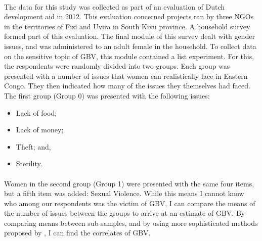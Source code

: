 \documentclass[11pt,a4paper]{scrartcl} %
\begin{document}
\paragraph{}
The data for this study was collected as part of an evaluation of Dutch development aid in 2012. This evaluation concerned projects ran by three NGOs in the territories of Fizi and Uvira in South Kivu province. A household survey formed part of this evaluation. The final module of this survey dealt with gender issues, and was administered to an adult female in the household.  To collect data on the sensitive topic of GBV, this module contained a list experiment. For this, the respondents were randomly divided into two groups. Each group was presented with a number of issues that women can realistically face in Eastern Congo. They then indicated how many of the issues they themselves had faced. The first group (Group 0) was presented with the following issues:
\begin{itemize}
	\item Lack of food;
	\item Lack of money;
	\item Theft; and,
	\item Sterility.
\end{itemize}

\paragraph{}
 Women in the second group (Group 1) were presented with the same four items, but a fifth item was added: Sexual Violence. While this means I cannot know who among our respondents was the victim of GBV, I can compare the means of the number of issues between the groups to arrive at an estimate of GBV. By comparing means between sub-samples, and by using more sophisticated methods proposed by \citet{Imai2011}, I can find the correlates of GBV. 

\paragraph{}





\end{document}
